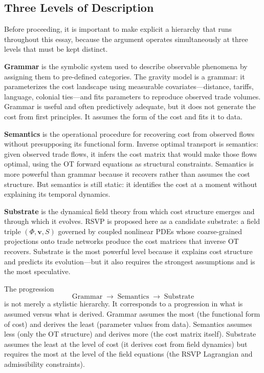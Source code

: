 \documentclass[12pt]{article}
\begin{document}
\subsection{Three Levels of Description}

Before proceeding, it is important to make explicit a hierarchy that runs throughout this essay, because the argument operates simultaneously at three levels that must be kept distinct.

\textbf{Grammar} is the symbolic system used to describe observable phenomena by assigning them to pre-defined categories. The gravity model is a grammar: it parameterizes the cost landscape using measurable covariates---distance, tariffs, language, colonial ties---and fits parameters to reproduce observed trade volumes. Grammar is useful and often predictively adequate, but it does not generate the cost from first principles. It assumes the form of the cost and fits it to data.

\textbf{Semantics} is the operational procedure for recovering cost from observed flows without presupposing its functional form. Inverse optimal transport is semantics: given observed trade flows, it infers the cost matrix that would make those flows optimal, using the OT forward equations as structural constraints. Semantics is more powerful than grammar because it recovers rather than assumes the cost structure. But semantics is still static: it identifies the cost at a moment without explaining its temporal dynamics.

\textbf{Substrate} is the dynamical field theory from which cost structure emerges and through which it evolves. RSVP is proposed here as a candidate substrate: a field triple $(\Phi, \mathbf{v}, S)$ governed by coupled nonlinear PDEs whose coarse-grained projections onto trade networks produce the cost matrices that inverse OT recovers. Substrate is the most powerful level because it explains cost structure and predicts its evolution---but it also requires the strongest assumptions and is the most speculative.

The progression
\[
\text{Grammar} \;\longrightarrow\; \text{Semantics} \;\longrightarrow\; \text{Substrate}
\]
is not merely a stylistic hierarchy. It corresponds to a progression in what is assumed versus what is derived. Grammar assumes the most (the functional form of cost) and derives the least (parameter values from data). Semantics assumes less (only the OT structure) and derives more (the cost matrix itself). Substrate assumes the least at the level of cost (it derives cost from field dynamics) but requires the most at the level of the field equations (the RSVP Lagrangian and admissibility constraints).
\end{document}
